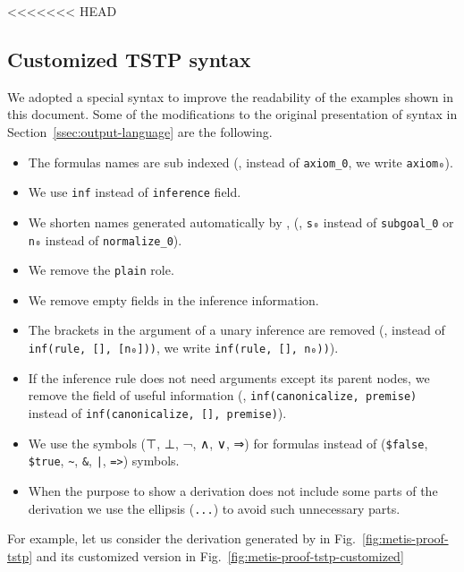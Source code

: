 \documentclass[../main.tex]{subfiles}
\begin{document}
%
<<<<<<< HEAD
\clearpage
%
\begin{subappendices}
%
\renewcommand{\thesection}{\Alph{section}}%
%
\section{Customized TSTP syntax}
\label{app:tstp-syntax}

We adopted a special \TSTP syntax to improve the readability of the \TSTP
examples shown in this document. Some of the modifications to the original
presentation of \TSTP syntax in Section~\ref{ssec:output-language} are the
following.

\begin{itemize}
  \item The formulas names are sub indexed (\eg, instead of \verb!axiom_0!,
  we write \verb!axiom₀!).
  \item We use \verb!inf! instead of \verb!inference! field.
  \item We shorten names generated automatically by \Metis, (\eg,
\verb!s₀! instead of \verb!subgoal_0! or \verb!n₀!
instead of \verb!normalize_0!).
  \item We remove the \verb!plain! role.
  \item We remove empty fields in the inference information.
  \item The brackets in the argument of a unary inference are removed (\eg,
instead of \verb!inf(rule, [], [n₀]))!, we write
\verb!inf(rule, [], n₀))!).
  \item If the inference rule does not need arguments except its parent nodes,
  we remove the field of useful information (\eg,
 \verb!inf(canonicalize, premise)! instead of
 \verb!inf(canonicalize, [], premise)!).
  \item We use the symbols (⊤, ⊥, ¬, ∧, ∨, ⇒) for formulas instead of
  (\verb!$false!, \verb!$true!, \verb!~!, \verb!&!, \verb!|!, \verb!=>!) \TPTP symbols.
  \item When the purpose to show a \TSTP derivation does not include
  some parts of the derivation we use the ellipsis (\verb!...!) to avoid
  such unnecessary parts.
\end{itemize}

For example, let us consider the \TSTP derivation generated by \Metis
in Fig.~\ref{fig:metis-proof-tstp} and its customized version in
Fig.~\ref{fig:metis-proof-tstp-customized}


\end{subappendices}
\end{document}

